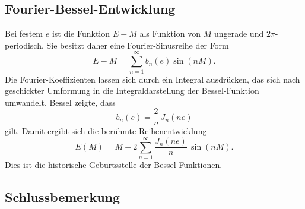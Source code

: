 \subsection{Fourier-Bessel-Entwicklung
\label{bessel:subsection:fourier-bessel}}
%

Bei festem $e$ ist die Funktion $E - M$ als Funktion von $M$ ungerade und $2\pi$-periodisch.
Sie besitzt daher eine Fourier-Sinusreihe der Form
\begin{equation}
E - M
=
\sum_{n=1}^{\infty} b_n(e) \sin(nM).
\label{bessel:equation:fourier-ansatz}
\end{equation}
Die Fourier-Koeffizienten lassen sich durch ein Integral ausdrücken, das sich nach geschickter Umformung in die Integraldarstellung der Bessel-Funktion umwandelt.
Bessel zeigte, dass
\begin{equation}
b_n(e) = \frac{2}{n}\, J_n(ne)
\label{bessel:equation:bessel-koeff}
\end{equation}
gilt.
Damit ergibt sich die berühmte Reihenentwicklung
\begin{equation}
\boxed{\;
E(M)
=
M + 2 \sum_{n=1}^{\infty} \frac{J_n(ne)}{n}\, \sin(nM).
\;}
\label{bessel:equation:kepler-loesung}
\end{equation}
Dies ist die historische Geburtsstelle der Bessel-Funktionen.

\subsection{Schlussbemerkung
\label{bessel:subsection:schluss}}

